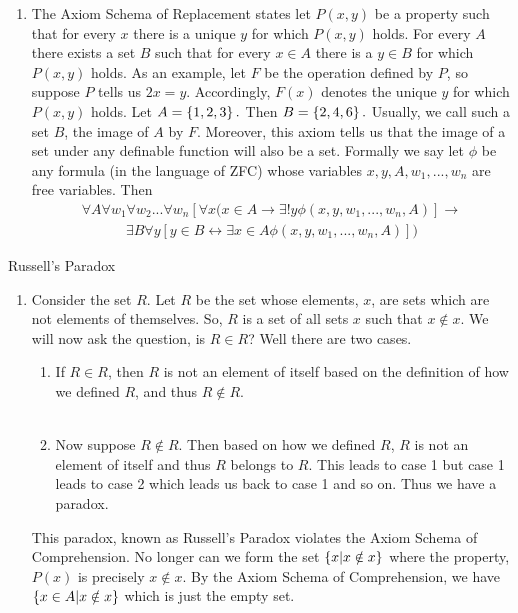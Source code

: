 \documentclass[12pt]{article}
\begin{document}
\begin{enumerate}
\item The Axiom Schema of Replacement states let $P(x,y)$ be a property such that for every $x$ there is a unique $y$ for which $P(x,y)$ holds. For every $A$ there exists a set $B$ such that for every $x \in A$ there is a $y \in B$ for which $P(x,y)$ holds. As an example, let $F$ be the operation defined by $P$, so suppose $P$ tells us $2x=y$. Accordingly, $F(x)$ denotes the unique $y$ for which $P(x,y)$ holds. Let $A=\left\{1,2,3\right\}.$ Then $B=\left\{2,4,6\right\}.$ Usually, we call such a set $B$, the image of $A$ by $F$. Moreover, this axiom tells us that the image of a set under any definable function will also be a set. Formally we say let $\phi$ be any formula (in the language of ZFC) whose variables  $x, y, A, w_{1}, ... , w_{n}$ are free variables. Then
\begin{align*}
\forall A \forall w_{1} \forall w_{2} ... \forall w_{n} [\forall x (x \in A \rightarrow \exists ! y \phi (x, y, w_{1}, ... , w_{n}, A)] \rightarrow 
\end{align*}
\begin{align*}
 \exists B \forall y [y \in B \leftrightarrow \exists x \in A \phi (x, y, w_{1}, ... , w_{n}, A)])
\end{align*}
\end{enumerate}

\problem Russell's Paradox \\
\begin{enumerate}
\item Consider the set $R$. Let $R$ be the set whose elements, $x$, are sets which are not elements of themselves. So, $R$ is a set of all sets $x$ such that $x \notin x$. We will now ask the question, is $R \in R$? Well there are two cases.\\
\begin{enumerate}
\item If $R \in R$, then $R$ is not an element of itself based on the definition of how we defined $R$, and thus $R \notin R$. \\\\
\item Now suppose $R \notin R$. Then based on how we defined $R$, $R$ is not an element of itself and thus $R$ belongs to $R$. This leads to case 1 but case 1 leads to case 2 which leads us back to case 1 and so on. Thus we have a paradox.
\end{enumerate}
This paradox, known as Russell's Paradox violates the Axiom Schema of Comprehension. No longer can we form the set $\left\{x|x \notin x\right\}$ where the property, $P(x)$ is precisely $x \notin x$. By the Axiom Schema of Comprehension, we have$\left\{x \in A|x \notin x\right\}$ which is just the empty set.
\end{enumerate} 
\end{document}
